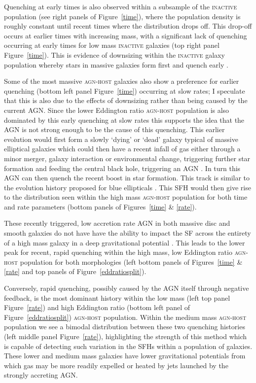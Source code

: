 Quenching at early times is also observed within a subsample of the \textsc{inactive} population (see right panels of Figure~\ref{time}), where the population density is roughly constant until recent times where the distribution drops off.  This drop-off occurs at earlier times with increasing mass, with a significant lack of quenching occurring at early times for low mass \textsc{inactive} galaxies (top right panel Figure~\ref{time}). This is evidence of downsizing within the \textsc{inactive} galaxy population whereby stars in massive galaxies form first and quench early \citep{Cowie96, Thomas10}. 

Some of the most massive \textsc{agn-host} galaxies also show a preference for earlier quenching (bottom left panel Figure~\ref{time}) occurring at slow rates; I speculate that this is also due to the effects of downsizing rather than being caused by the current AGN. Since the lower Eddington ratio \textsc{agn-host} population is also dominated by this early quenching at slow rates this supports the idea that the AGN is not strong enough to be the cause of this quenching.  This earlier evolution would first form a slowly `dying' or `dead' galaxy typical of massive elliptical galaxies which could then have a recent infall of gas either through a minor merger, galaxy interaction or environmental change, triggering further star formation and feeding the central black hole, triggering an AGN \citep{kaviraj14b}. In turn this AGN can then quench the recent boost in star formation. This track is similar to the evolution history proposed for blue ellipticals \citep[][and detected in the top panel of Figure~\ref{blue_c}]{Kaviraj13, McIntosh14, Haines15}. This SFH would then give rise to the distribution seen within the high mass \textsc{agn-host} population for both time and rate parameters (bottom panels of Figures~\ref{time} \& \ref{rate}).


These recently triggered, low accretion rate AGN in both massive disc and smooth galaxies do not have have the ability to impact the SF across the entirety of a high mass galaxy in a deep gravitational potential \citep{ishibashi12, Zinn13}. This leads to the lower peak for recent, rapid quenching within the high mass, low Eddington ratio \textsc{agn-host} population for both morphologies (left bottom panels of Figures~\ref{time} \& \ref{rate} and top panels of Figure~\ref{eddratiosplit}). 

Conversely, rapid quenching, possibly caused by the AGN itself through negative feedback, is the most dominant history within the low mass (left top panel Figure~\ref{rate}) and high Eddington ratio (bottom left panel of Figure~\ref{eddratiosplit}) \textsc{agn-host} population. Within the medium mass \textsc{agn-host} population we see a bimodal distribution between these two quenching histories (left middle panel Figure~\ref{rate}), highlighting the strength of this method which is capable of detecting such variation in the SFHs within a population of galaxies. These lower and medium mass galaxies have lower gravitational potentials from which gas may be more readily expelled or heated \citep{tortora09} by jets launched by the strongly accreting AGN. 

